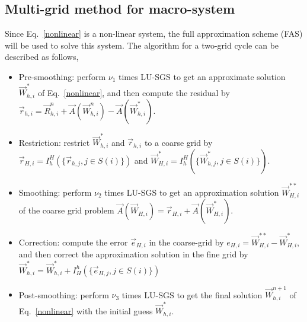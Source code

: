 \documentclass[3p,12pt]{elsarticle}
\begin{document}
	\subsection{Multi-grid method for macro-system}
	Since Eq.~\eqref{nonlinear} is a non-linear system, the full approximation scheme (FAS) \cite{brandt2011multigrid} will be used to solve this system. The algorithm for a two-grid cycle can be described as follows,
	\begin{itemize}
		\item Pre-smoothing: perform $\nu_1$ times LU-SGS to get an approximate solution $\vec{W}_{h,i}^*$ of Eq.~\eqref{nonlinear}, and then compute the residual by $\vec{r}_{h,i} = \vec{R}_{h,i}^n + \vec{A}\left(\vec{W}_{h,i}^n \right) - \vec{A}\left(\vec{W}_{h,i}^* \right)$.
		\item Restriction: restrict $\vec{W}_{h,i}^*$ and $\vec{r}_{h,i}$ to a coarse grid by $\vec{r}_{H,i} = I_{h}^{H}(\{ \vec{r}_{h,j}, j \in S(i)\})$ and $\vec{W}_{H,i}^* = I_{h}^{H}(\{ \vec{W}_{h,j}^*, j \in S(i)\})$.
		\item Smoothing: perform $\nu_2$ times LU-SGS to get an approximation solution $\vec{W}_{H,i}^{**}$ of the coarse grid problem $\vec{A}\left(\vec{W}_{H,i}\right) = \vec{r}_{H,i} + \vec{A}\left(\vec{W}_{H,i}^* \right)$.
		\item Correction: compute the error $\vec{e}_{H,i}$ in the coarse-grid by $e_{H,i} = \vec{W}_{H,i}^{**} - \vec{W}_{H,i}^{*}$, and then correct the approximation solution in the fine grid by $\vec{W}_{h,i}^* = \vec{W}_{h,i}^* + I_{H}^{h}(\{ \vec{e}_{H,j}, j \in S(i)\})$
		\item Post-smoothing: perform $\nu_3$ times LU-SGS to get the final solution $\vec{W}_{h,i}^{n+1}$ of Eq.~\eqref{nonlinear} with the initial guess $\vec{W}_{h,i}^*$.
	\end{itemize}
\end{document}

